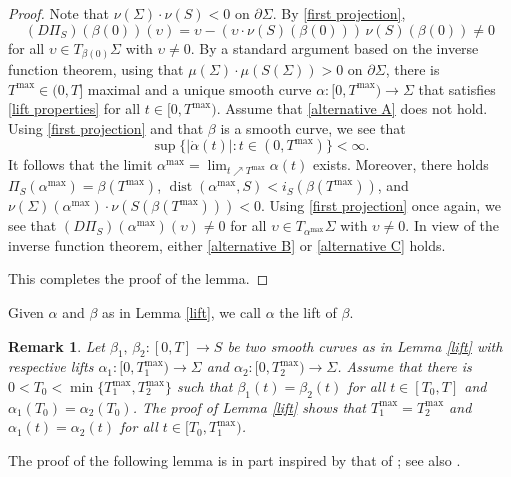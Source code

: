 \documentclass[11pt]{amsart}
\newtheorem{rema}[prop]{Remark}
\begin{document}
\begin{proof}
Note that $\nu(\Sigma)\cdot \nu(S)< 0$ on $\partial \Sigma$. By \eqref{first projection},    
	$$
	(D\Pi_S)(\beta(0))(\upsilon)=\upsilon-  (\upsilon\cdot \nu(S)(\beta(0)))\,\nu(S)(\beta(0))\neq 0	$$
	for all $\upsilon\in T_{\beta(0)}\Sigma$ with $\upsilon\neq 0$. 
	By a standard argument based on the inverse function theorem, using that $\mu(\Sigma)\cdot \mu(S(\Sigma))>0$ on $\partial \Sigma$, there is $T^{\max}\in(0, T]$ maximal and  a unique smooth curve $\alpha:[0, T^{\max})\to \Sigma$ that satisfies \eqref{lift properties} for all $t\in[0,T^{\max})$. Assume that \eqref{alternative A} does not hold. Using \eqref{first projection} and that $\beta$ is a smooth curve, we see that 
	$$
	\sup\{|\dot \alpha(t)|:t\in(0,T^{\max})\}<\infty.
	$$
	It follows that the limit $\alpha^{\max}=\lim_{t\nearrow T^{\max}}\alpha(t)$ exists. Moreover, there holds $\Pi_S(\alpha^{\max})=\beta(T^{\max})$,  $\operatorname{dist}(\alpha^{\max},S)<i_S(\beta(T^{\max}))$, and $\nu(\Sigma)(\alpha^{\max})\cdot \nu(S(\beta(T^{\max})))<0$. Using \eqref{first projection} once again, we see that 
	$
	(D\Pi_S)(\alpha^{\max})(\upsilon)\neq 0
	$
	for all $\upsilon\in T_{\alpha^{\max}}\Sigma$ with $\upsilon\neq 0$.
	In view of the inverse function theorem,  either \eqref{alternative B} or \eqref{alternative C} holds.
	
	This completes the proof of the lemma.
\end{proof}
Given $\alpha$ and $\beta$ as in Lemma \ref{lift}, we call $\alpha$ the lift of $\beta$.
\begin{rema} \label{uniqueness of lifts}
 Let $\beta_1,\,\beta_2:[0, T]\to S$  be two smooth curves as in Lemma \ref{lift} with respective lifts $\alpha_1:[0,T^{\max}_1)\to \Sigma$ and $\alpha_2:[0,T^{\max}_2)\to \Sigma$. Assume that there is $0<T_0<\min\{T^{\max}_1,T^{\max}_2\}$ such that $\beta_1(t)=\beta_2(t)$ for all $t\in [T_0,T]$ and $\alpha_1(T_0)=\alpha_2(T_0)$. 	The proof of Lemma \ref{lift} shows that $T^{\max}_1=T^{\max}_2$ and $\alpha_1(t)=\alpha_2(t)$ for all $t\in[T_0,T^{\max}_1)$.   
\end{rema}

The proof of the following lemma is in part inspired by that of \cite[Lemma 4.8]{chodoshedelenli}; see also \cite{Simon}.
\end{document}
